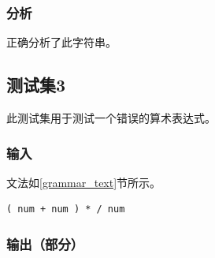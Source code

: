 \documentclass[lang=cn,11pt,a4paper,cite=authornum]{paper}
\begin{document}
\subsubsection{分析}

正确分析了此字符串。

\subsection{测试集3}

此测试集用于测试一个错误的算术表达式。

\subsubsection{输入}

文法如\ref{grammar_text}节所示。

\begin{code}
\begin{verbatim}
( num + num ) * / num
\end{verbatim}
\end{code}

\subsubsection{输出（部分）}
\end{document}
